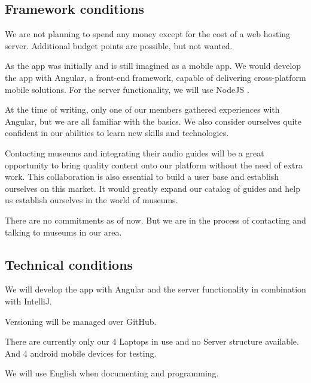 \documentclass[12pt]{article}
\theoremstyle{definition}
\newenvironment{text}{
}{}
\begin{document}
\subsection{Framework conditions} 
\begin{text}

We are not planning to spend any money except for the cost of a web hosting server. Additional budget points are possible, but not wanted.\newline

As the app was initially and is still imagined as a mobile app. We would develop the app with Angular, a front-end framework, capable of delivering cross-platform mobile solutions. For the server functionality, we will use NodeJS .\newline
 
At the time of writing, only one of our members gathered experiences with Angular, but we are all familiar with the basics.
We also consider ourselves quite confident in our abilities to learn new skills and technologies.\newline
 
Contacting museums and integrating their audio guides will be a great opportunity to bring quality content onto our platform without the need of extra work. This collaboration is also essential to build a user base and establish ourselves on this market.
It would greatly expand our catalog of guides and help us establish ourselves in the world of museums.\newline
 
There are no commitments as of now. But we are in the process of contacting and talking to museums in our area.

\end{text}

\subsection{Technical conditions}
\begin{text}

We will develop the app with Angular and the server functionality in combination with IntelliJ.

Versioning will be managed over GitHub.\newline
 
There are currently only our 4 Laptops in use and no Server structure available. And 4 android mobile devices for testing.\newline
 
We will use English when documenting and programming.

\end{text}
  
\end{document}
